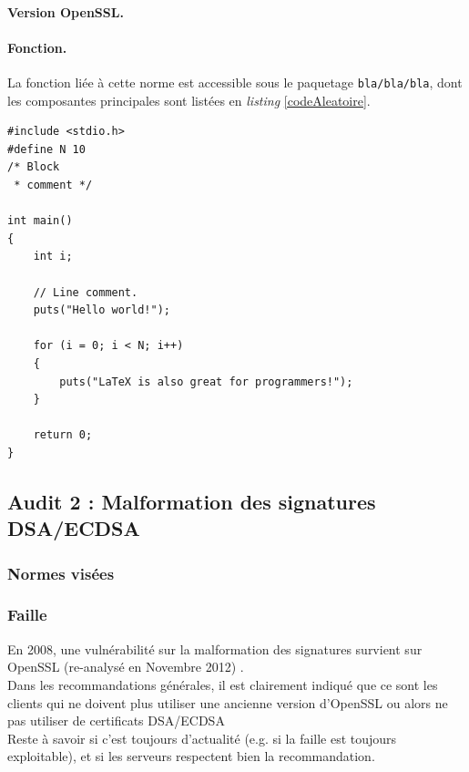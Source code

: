 			\paragraph{Version OpenSSL.\\}
			
			\paragraph{Fonction.\\}
			La fonction liée à cette norme est accessible sous le paquetage
			\texttt{bla/bla/bla}, dont les composantes principales sont 
			listées en \textit{listing} \ref{codeAleatoire}.
		
		
		\begin{lstlisting}[style=customc,caption=codeAleatoire.c, label=codeAleatoire]
#include <stdio.h>
#define N 10
/* Block
 * comment */
 
int main()
{
    int i;
 
    // Line comment.
    puts("Hello world!");
 
    for (i = 0; i < N; i++)
    {
        puts("LaTeX is also great for programmers!");
    }
 
    return 0;
}
		\end{lstlisting}
		
\subsection{Audit 2 : Malformation des signatures DSA/ECDSA}
		\subsubsection{Normes visées}
	
		
		\subsubsection{Faille}
		
			
		En 2008, une vulnérabilité sur la malformation des signatures 
		survient sur OpenSSL (re-analysé en Novembre 2012)
		\cite{openssl2009secadv} \cite{cve-2008-5077}.\\
	
		Dans les recommandations générales, il est clairement indiqué que ce sont 
		les clients qui ne doivent plus utiliser une ancienne version d'OpenSSL
		ou alors ne pas utiliser de certificats DSA/ECDSA\\
	
		Reste à savoir si c'est toujours d'actualité (e.g. si la faille est
		toujours exploitable), et si les serveurs respectent bien la
		recommandation.
	
